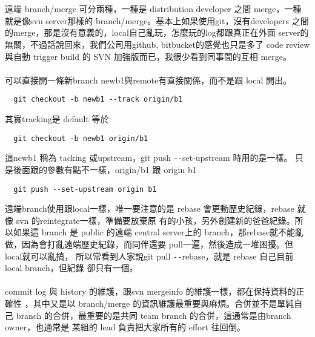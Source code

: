   \\\\
  遠端 branch/merge 可分兩種，一種是 distribution developer 之間 merge，一種
  就是像svn server那樣的 branch/merge。基本上如果使用git，沒有developers
  之間的merge，那是沒有意義的，local自己亂玩，怎麼玩的log都跟真正在外面
  server的無關，不過話說回來，我們公司用github, bitbucket的感覺也只是多了
  code review 與自動 trigger build 的 SVN 加強版而已，我很少看到同事間的互相
  merge。
  \\\\
  可以直接開一條新branch newb1與remote有直接關係，而不是跟 local 開出。
  \begin{verbatim}
  git checkout -b newb1 --track origin/b1
  \end{verbatim}
  其實tracking是 default 等於
  \begin{verbatim}
  git checkout -b newb1 origin/b1
  \end{verbatim}
  這newb1 稱為 tacking 或upstream，git push \verb=--=set-upstream 時用的是一樣。
  只是後面跟的參數有點不一樣，origin/b1 跟 origin b1
  \begin{verbatim}
  git push --set-upstream origin b1
  \end{verbatim}
  遠端branch使用跟local一樣，唯一要注意的是
  rebase 會更動歷史紀錄，rebase 就像 svn 的reintegrate一樣，準備要放棄原
  有的小孩，另外創建新的爸爸紀錄。所以如果這 branch 是 public 的遠端 central
  server上的 branch，那rebase就不能亂做，因為會打亂遠端歷史紀錄，而同伴還要
  pull一遍，然後造成一堆困擾。但local就可以亂搞，
  所以常看到人家說git pull \verb=--=rebase，就是 rebase 自己目前 local branch，但紀錄
  卻只有一個。
  \\\\
  commit log 與 history 的維護，跟svn mergeinfo 的維護一樣，都在保持資料的正確性
  ，其中又是以 branch/merge 的資訊維護最重要與麻煩。合併並不是單純自己 branch
  的合併，最重要的是共同 team branch 的合併，這通常是由branch owner，也通常是
  某組的 lead 負責把大家所有的 effort 往回倒。

